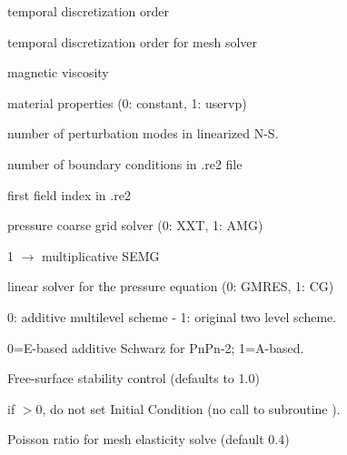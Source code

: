 \documentclass[letterpaper,10pt,english]{sphinxmanual}
\begin{document}
\begin{DUlineblock}{0em}
\item[] 
\item[]   temporal discretization order
\item[] 
\item[]   temporal discretization order for mesh solver
\item[] 
\item[]   magnetic viscosity
\item[] 
\item[]   material properties (0: constant, 1: uservp)
\item[] 
\item[]   number of perturbation modes in linearized N-S.
\item[] 
\item[]   number of boundary conditions in .re2 file
\item[] 
\item[]   first field index in .re2
\item[] 
\item[]   pressure coarse grid solver (0: XXT, 1: AMG)
\item[] 
\item[]  1 \(\rightarrow\) multiplicative SEMG
\item[] 
\item[]  linear solver for the pressure equation (0: GMRES, 1: CG)
\item[] 
\item[]  0: additive multilevel scheme - 1: original two level scheme.
\item[] 
\item[]  0=E-based additive Schwarz for PnPn-2; 1=A-based.
\item[] 
\item[]  Free-surface stability control (defaults to 1.0)
\item[] 
\item[]  if \(>0\), do not set Initial Condition (no call to subroutine ).
\item[] 
\item[]  Poisson ratio for mesh elasticity solve (default 0.4)
\item[] 

\end{DUlineblock}
\end{document}
